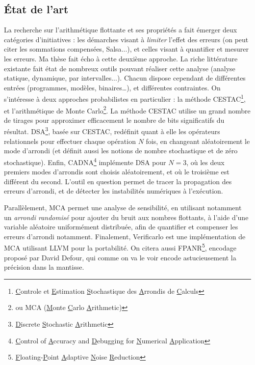 \documentclass[a4paper,11pt]{article}
\begin{document}

\subsection{État de l’art}

La recherche sur l'arithmétique flottante et ses propriétés a fait émerger deux catégories d'initiatives : les démarches visant à \textit{limiter} l’effet des erreurs (on peut citer les sommations compensées\cite{Demmel2006ErrorBF}, Salsa\cite{damouche2016amelioration}...), et celles visant à quantifier et mesurer les erreurs.
Ma thèse fait écho à cette deuxième approche.
La riche littérature existante fait état de nombreux outils pouvant réaliser cette analyse (analyse statique\cite{goubault2001static}, dynamique\cite{jeffrey2011dynamic}, par intervalles\cite{hansen1965interval}...). Chacun dispose cependant de différentes entrées (programmes, modèles, binaires…), et différentes contraintes.
On s’intéresse à deux approches probabilistes en particulier : la méthode CESTAC\footnote{\underline{C}ontrole et \underline{E}stimation \underline{S}tochastique des \underline{A}rrondis de \underline{C}alculs}, et l’arithmétique de Monte Carlo\footnote{ou MCA (\underline{M}onte \underline{C}arlo \underline{A}rithmetic)}.
La méthode CESTAC\cite{pichat1993ingenierie} utilise un grand nombre de tirages pour approximer efficacement le nombre de bits significatifs du résultat.
DSA\footnote{\underline{D}iscrete \underline{S}tochastic \underline{A}rithmetic}\cite{vignes2004discrete}, basée sur CESTAC, redéfinit quant à elle les opérateurs relationnels pour effectuer chaque opération $N$ fois, en changeant aléatoirement le mode d’arrondi (et définit aussi les notions de nombre stochastique et de zéro stochastique).
Enfin, CADNA\footnote{\underline{C}ontrol of \underline{A}ccuracy and \underline{D}ebugging for \underline{N}umerical \underline{A}pplication}\cite{jezequel2008cadna} implémente DSA pour $N=3$, où les deux premiers modes d’arrondis sont choisis aléatoirement, et où le troisième est différent du second. L'outil en question permet de tracer la propagation des erreurs d'arrondi, et de détecter les instabilités numériques à l'exécution. 

Parallèlement, MCA\cite{parker1997monte} permet une analyse de sensibilité, en utilisant notamment un \textit{arrondi randomisé} pour ajouter du bruit aux nombres flottants, à l'aide d'une variable aléatoire uniformément distribuée, afin de quantifier et compenser les erreurs d'arrondi notamment.
Finalement, Verificarlo\cite{denis2015verificarlo} est une implémentation de MCA utilisant LLVM\cite{llvmweb} pour la portabilité.
On citera aussi FPANR\footnote{\underline{F}loating-\underline{P}oint \underline{A}daptive \underline{N}oise \underline{R}eduction}\cite{defour2018fp}, encodage proposé par David Defour, qui comme on va le voir encode astucieusement la précision dans la mantisse.
\end{document}

